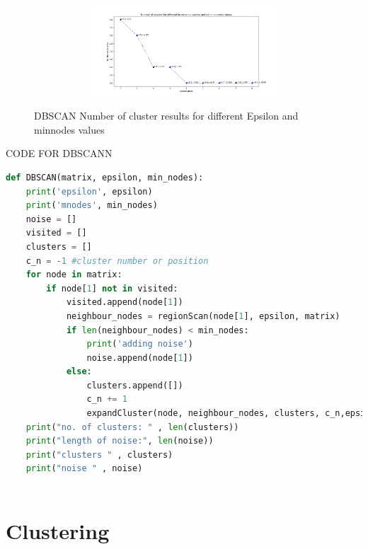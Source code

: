 \documentclass{article}
\begin{document}
\begin{figure}[H]
\begin{subfigure}{1\textwidth}
\begin{subfigure}{.5\textwidth}
            \caption{}
        \end{subfigure}
        \begin{subfigure}{.5\textwidth} 
            \centering  
            \includegraphics[width=1\linewidth]{./img/inc.png}
            \caption{}
        \end{subfigure}                
    \end{subfigure}
    \caption{DBSCAN Number of cluster results for different Epsilon and minnodes values}
    \label{fig:dbresults}
\end{figure}

CODE FOR DBSCANN
\begin{lstlisting}[language=Python, caption= DBSCAN Algorithm, label={lst:DBSCAN implementation}]
def DBSCAN(matrix, epsilon, min_nodes):
    print('epsilon', epsilon)
    print('mnodes', min_nodes)
    noise = []
    visited = []
    clusters = []
    c_n = -1 #cluster number or position
    for node in matrix:
        if node[1] not in visited:
            visited.append(node[1])
            neighbour_nodes = regionScan(node[1], epsilon, matrix)
            if len(neighbour_nodes) < min_nodes:
                print('adding noise')
                noise.append(node[1])
            else:
                clusters.append([])
                c_n += 1
                expandCluster(node, neighbour_nodes, clusters, c_n,epsilon, min_nodes, matrix, visited)
    print("no. of clusters: " , len(clusters))
    print("length of noise:", len(noise))
    print("clusters " , clusters)
    print("noise " , noise)
            
            \end{lstlisting}

\newpage
\section{Clustering}
        
\end{document}
